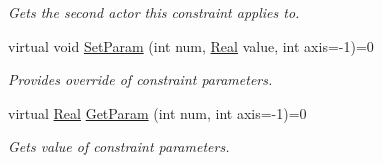 \begin{DoxyCompactItemize}
\begin{DoxyCompactList}\small\item\em Gets the second actor this constraint applies to. \item\end{DoxyCompactList}\item 
virtual void \hyperlink{classphys_1_1TypedConstraint_a31a20a74094f0cb8e4f82d1f99725415}{SetParam} (int num, \hyperlink{namespacephys_af7eb897198d265b8e868f45240230d5f}{Real} value, int axis=-\/1)=0
\begin{DoxyCompactList}\small\item\em Provides override of constraint parameters. \item\end{DoxyCompactList}\item 
virtual \hyperlink{namespacephys_af7eb897198d265b8e868f45240230d5f}{Real} \hyperlink{classphys_1_1TypedConstraint_ab6140d40e9476c3dc46e2802e8097421}{GetParam} (int num, int axis=-\/1)=0
\begin{DoxyCompactList}\small\item\em Gets value of constraint parameters. \item\end{DoxyCompactList}\end{DoxyCompactItemize}
